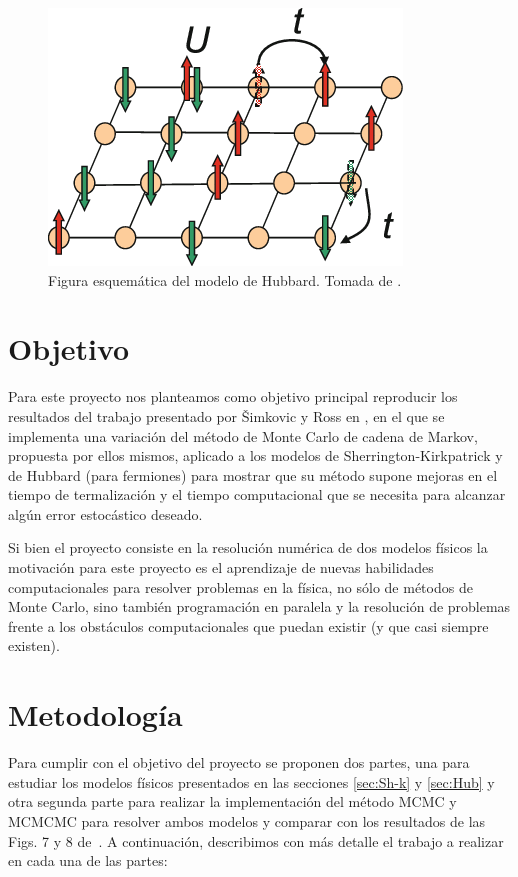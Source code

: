 \documentclass[letterpaper,superscriptaddress,aps,pra,nolongbibliography,twocolumn,showpacs,floatfix,10pt]{revtex4-2} %
\renewcommand{\>}{\rangle}
\newcommand{\<}{\langle}
\begin{document}
\begin{figure}
\includegraphics[width=0.7\columnwidth]{hubbard_model}
\caption{Figura esquemática del modelo de Hubbard. Tomada de \cite{10.1007/978-3-319-69953-0_14}.}
\label{fig:hubbard}
\end{figure}

\section{Objetivo}
Para este proyecto nos planteamos como objetivo principal 
reproducir los resultados del trabajo presentado por Šimkovic y Ross 
en \cite{simkovic2021manyconfiguration}, en el que se implementa una
variación del método de Monte Carlo de cadena de Markov, propuesta
por ellos mismos, aplicado a los modelos de Sherrington-Kirkpatrick y 
de Hubbard (para fermiones) para mostrar que su método supone mejoras en el
tiempo de termalización y el tiempo computacional que se necesita
para alcanzar algún error estocástico deseado.

Si bien el proyecto consiste en la resolución numérica de dos modelos físicos
la motivación para este proyecto es el aprendizaje de nuevas habilidades computacionales
para resolver problemas en la física, no sólo de métodos 
de Monte Carlo, sino también programación en paralela y la resolución 
de problemas frente a los obstáculos computacionales que puedan existir 
(y que casi siempre existen).

\section{Metodología}
Para cumplir con el objetivo del proyecto
se proponen dos partes, una para estudiar los modelos físicos presentados 
en las secciones \ref{sec:Sh-k} y \ref{sec:Hub} y otra segunda parte para
realizar la implementación del método MCMC y MCMCMC para resolver 
ambos modelos y comparar con los resultados de las Figs. 7 y 8 de~\citep{simkovic2021manyconfiguration}.
A continuación, describimos con más detalle el trabajo a realizar en cada
una de las partes:
\end{document}
